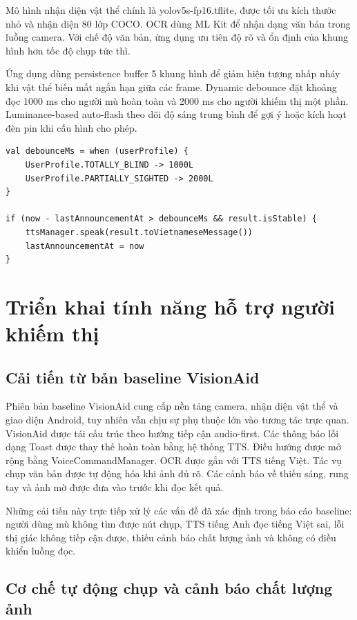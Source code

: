 \documentclass[a4paper,13pt]{report}
\begin{document}
Mô hình nhận diện vật thể chính là yolov5s-fp16.tflite, được tối ưu kích thước nhỏ và nhận diện 80 lớp COCO. OCR dùng ML Kit để nhận dạng văn bản trong luồng camera. Với chế độ văn bản, ứng dụng ưu tiên độ rõ và ổn định của khung hình hơn tốc độ chụp tức thì.

Ứng dụng dùng persistence buffer 5 khung hình để giảm hiện tượng nhấp nháy khi vật thể biến mất ngắn hạn giữa các frame. Dynamic debounce đặt khoảng đọc 1000 ms cho người mù hoàn toàn và 2000 ms cho người khiếm thị một phần. Luminance-based auto-flash theo dõi độ sáng trung bình để gợi ý hoặc kích hoạt đèn pin khi cấu hình cho phép.

\begin{lstlisting}[caption={Ví dụ logic debounce theo hồ sơ người dùng}]
val debounceMs = when (userProfile) {
    UserProfile.TOTALLY_BLIND -> 1000L
    UserProfile.PARTIALLY_SIGHTED -> 2000L
}

if (now - lastAnnouncementAt > debounceMs && result.isStable) {
    ttsManager.speak(result.toVietnameseMessage())
    lastAnnouncementAt = now
}
\end{lstlisting}

\chapter{Triển khai tính năng hỗ trợ người khiếm thị}

\section{Cải tiến từ bản baseline VisionAid}

Phiên bản baseline VisionAid cung cấp nền tảng camera, nhận diện vật thể và giao diện Android, tuy nhiên vẫn chịu sự phụ thuộc lớn vào tương tác trực quan. VisionAid được tái cấu trúc theo hướng tiếp cận audio-first. Các thông báo lỗi dạng Toast được thay thế hoàn toàn bằng hệ thống TTS. Điều hướng được mở rộng bằng VoiceCommandManager. OCR được gắn với TTS tiếng Việt. Tác vụ chụp văn bản được tự động hóa khi ảnh đủ rõ. Các cảnh báo về thiếu sáng, rung tay và ảnh mờ được đưa vào trước khi đọc kết quả.

Những cải tiến này trực tiếp xử lý các vấn đề đã xác định trong báo cáo baseline: người dùng mù không tìm được nút chụp, TTS tiếng Anh đọc tiếng Việt sai, lỗi thị giác không tiếp cận được, thiếu cảnh báo chất lượng ảnh và không có điều khiển luồng đọc.

\section{Cơ chế tự động chụp và cảnh báo chất lượng ảnh}
\end{document}

